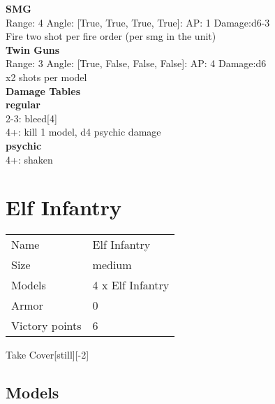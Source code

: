 {\bf SMG } \\



Range: 4  Angle: [True, True, True, True]: AP: 1 Damage:d6-3 \\
Fire two shot per fire order (per smg in the unit)\\ 




{\bf Twin Guns } \\



Range: 3  Angle: [True, False, False, False]: AP: 4 Damage:d6 \\
x2 shots per model\\ 




 





{\bf Damage Tables} \\
 {\bf regular } \\
2-3: bleed[4] \\
4+: kill 1 model, d4 psychic damage \\
 {\bf psychic } \\
4+: shaken \\










\pagebreak\pagebreak

\section{ Elf Infantry }

\begin{tabular}{ll}
  Name & Elf Infantry \\
  Size & medium\\
  Models & 4 x Elf Infantry\\
  Armor & 0\\
  Victory points & 6\\
\end{tabular}

Take Cover[still][-2]\\ 


\subsection{ Models }

